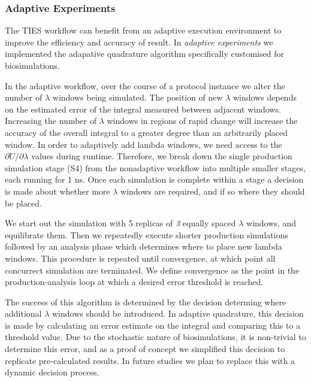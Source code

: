 
\subsubsection{Adaptive Experiments}

The TIES workflow can benefit from an adaptive execution environment to improve
the efficiency and accuracy of result. In \emph{adaptive experiments} we
implemented the adapative quadrature algorithm specifically customised for
biosimulations.

In the adaptive workflow, over the course of a protocol instance we alter
the number of $\lambda$ windows being simulated. The position of new $\lambda$
windows depends on the estimated error of the integral measured between
adjacent windows. Increasing the number of $\lambda$ windows in regions of
rapid change will increase the accuracy of the overall integral to a greater
degree than an
arbitrarily placed window. In order to adaptively add lambda windows, we need
access to the $\partial U/\partial\lambda$ values during runtime. Therefore, we break down the
single production simulation stage (S4) from the nonadaptive workflow into
multiple smaller stages, each running for 1 ns. Once each simulation is
complete within a stage a decision is made about whether more $\lambda$ windows
are required, and if so where they should be placed.

We start out the simulation with 5 replicas of \emph{3} equally spaced
$\lambda$ windows, and equilibrate them.
Then we repeatedly execute
shorter production simulations followed by an analysis phase which determines where to
place new lambda windows.
This procedure is repeated until convergence, at which point all
concurrect simulation are terminated.
We define convergence as the point in
the production-analysis loop at which a desired error threshold is
reached.

The success of this algorithm is determined by the decision determing
where additional $\lambda$ windows should be introduced.
In adaptive quadrature, this decision is made by
calculating an error estimate on the integral and comparing this to a threshold value.
Due to the stochastic nature of biosimulations, it is
non-trivial to determine this error, and as a proof of concept we simplified
this decision to replicate pre-calculated results. In future studies we plan
to replace this with a dynamic decision process.

